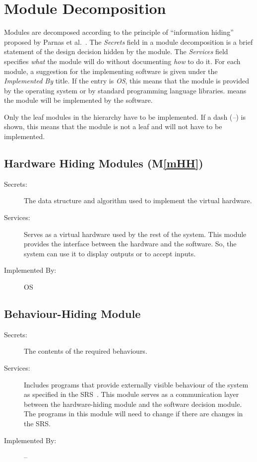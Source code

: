 \documentclass[12pt, titlepage]{article}
\newcommand{\mref}[1]{M\ref{#1}}
\begin{document}
\section{Module Decomposition} \label{SecMD}

Modules are decomposed according to the principle of ``information hiding''
proposed by Parnas et al.~\citep{ParnasEtAl1984}. The \emph{Secrets} field in a module
decomposition is a brief statement of the design decision hidden by the
module. The \emph{Services} field specifies \emph{what} the module will do
without documenting \emph{how} to do it. For each module, a suggestion for the
implementing software is given under the \emph{Implemented By} title. If the
entry is \emph{OS}, this means that the module is provided by the operating
system or by standard programming language libraries.  \emph{\progname{}} means the
module will be implemented by the \progname{} software.

Only the leaf modules in the hierarchy have to be implemented. If a dash
(\emph{--}) is shown, this means that the module is not a leaf and will not have
to be implemented.

\subsection{Hardware Hiding Modules (\mref{mHH})} \label{SecMDhh}

\begin{description}
\item[Secrets:]The data structure and algorithm used to implement the virtual
  hardware.
\item[Services:]Serves as a virtual hardware used by the rest of the
  system. This module provides the interface between the hardware and the
  software. So, the system can use it to display outputs or to accept inputs.
\item[Implemented By:] OS
\end{description}

\subsection{Behaviour-Hiding Module} \label{SecMDbh}

\begin{description}
\item[Secrets:] The contents of the required behaviours.
\item[Services:] Includes programs that provide externally visible behaviour of
  the system as specified in the SRS~\citep{TeamBVSH2026SRS}. This module serves
  as a communication layer between the hardware-hiding module and the software
  decision module. The programs in this module will need to change if there are
  changes in the SRS.
\item[Implemented By:] --
\end{description}
\end{document}
